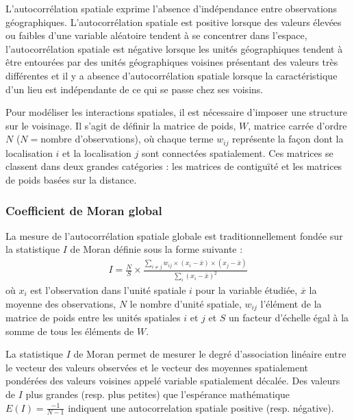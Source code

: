 \documentclass[10.5pt,a4paper]{article}
\begin{document}
{L'autocorrélation spatiale exprime l'absence d'indépendance entre observations géographiques. L'autocorrélation spatiale est positive lorsque des valeurs élevées ou faibles d'une variable aléatoire tendent à se concentrer dans l'espace, l'autocorrélation
spatiale est négative lorsque les unités géographiques tendent à être entourées par des unités
géographiques voisines présentant des valeurs très différentes et il y a absence d'autocorrélation
spatiale lorsque la caractéristique d'un lieu est indépendante de ce qui se passe chez ses voisins.\par


Pour modéliser les interactions spatiales, il est nécessaire d'imposer une structure sur le
voisinage. Il s'agit de définir la matrice de poids, $W$, matrice carrée d'ordre $N$ ($N=$nombre
d'observations), où chaque terme $w_{ij}$ représente la façon dont la localisation $i$ et la
localisation $j$ sont connectées spatialement. Ces matrices se classent dans deux grandes catégories
: les matrices de contiguïté et les matrices de poids basées sur la distance. \par

\subsubsection{Coefficient de Moran global}

La mesure de l'autocorrélation spatiale globale est traditionnellement fondée sur la statistique $I$
de Moran %
définie sous la forme suivante :
\begin{eqnarray}
  I={\frac{N}{S}}\times\frac{\sum_{i\neq{j}}w_{ij}\times({x_{i}-\bar{x}})\times({x_{j}-\bar{x}})}{\sum_{i}(x_{i}-\bar{x})^{2}}
\end{eqnarray}
où $x_{i}$ est l'observation dans l'unité spatiale $i$ pour la variable étudiée, $\overline{x}$ la
moyenne des observations, $N$ le nombre d'unité spatiale, $w_{ij}$ l'élément de la matrice de poids
entre les unités spatiales $i$ et $j$ et $S$ un facteur d'échelle égal à la somme de tous les éléments
de $W$.\par

La statistique $I$ de Moran permet de mesurer le degré d'association linéaire entre le vecteur des
valeurs observées et le vecteur des moyennes spatialement pondérées des valeurs voisines appelé
variable spatialement décalée. Des valeurs de $I$ plus grandes (resp. plus petites) que l'espérance
mathématique $E(I)=\frac{-1}{N-1}$ indiquent une autocorrelation spatiale positive (resp. négative).\par

}
\end{document}
